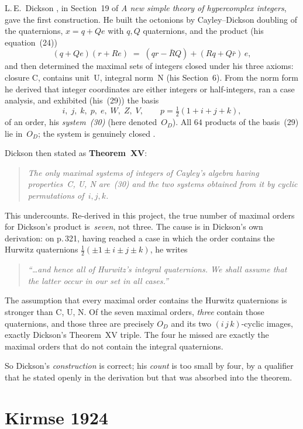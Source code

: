 \documentclass[11pt]{amsart}
\begin{document}
L.\,E.~Dickson \cite{Dickson1923}, in Section~19 of \emph{A new simple theory
of hypercomplex integers}, gave the first construction.  He built the
octonions by Cayley--Dickson doubling of the quaternions, $x = q + Qe$ with
$q, Q$ quaternions, and the product (his equation~(24))
\[
  (q + Qe)(r + Re) \;=\; (qr - \bar R Q) + (Rq + Q \bar r)\, e,
\]
and then determined the maximal sets of integers closed under his three
axioms: closure C, contains unit~U, integral norm~N (his Section~6).
From the norm form he derived that integer coordinates are either integers
or half-integers, ran a case analysis, and exhibited (his~(29)) the basis
\[
  i,\; j,\; k,\; p,\; e,\; W,\; Z,\; V,
  \qquad p = \tfrac{1}{2}(1 + i + j + k),
\]
of an order, his \emph{system~(30)} (here denoted~$O_D$).  All $64$ products
of the basis~(29) lie in~$O_D$; the system is genuinely closed
\cite{Dickson1923}.

Dickson then stated as \textbf{Theorem~XV}:
\begin{quote}
\emph{The only maximal systems of integers of Cayley's algebra having
properties~C, U, N are~(30) and the two systems obtained from it by
cyclic permutations of~$i, j, k$.}
\end{quote}
This undercounts.  Re-derived in this project, the true number of maximal
orders for Dickson's product is~\emph{seven}, not three.  The cause is in
Dickson's own derivation: on p.\,321, having reached a case in which the
order contains the Hurwitz quaternions $\tfrac{1}{2}(\pm 1 \pm i \pm j \pm
k)$, he writes
\begin{quote}
\emph{``\ldots and hence all of Hurwitz's integral quaternions.  We shall
assume that the latter occur in our set in all cases.''}
\end{quote}
The assumption that every maximal order contains the Hurwitz quaternions is
stronger than C, U, N.  Of the seven maximal orders, \emph{three} contain
those quaternions, and those three are precisely $O_D$ and its two
$(i\,j\,k)$-cyclic images, exactly Dickson's Theorem~XV triple.  The four
he missed are exactly the maximal orders that do not contain the integral
quaternions.

So Dickson's \emph{construction} is correct; his \emph{count} is too small
by four, by a qualifier that he stated openly in the derivation but that was
absorbed into the theorem.

\section*{Kirmse 1924}
\end{document}
